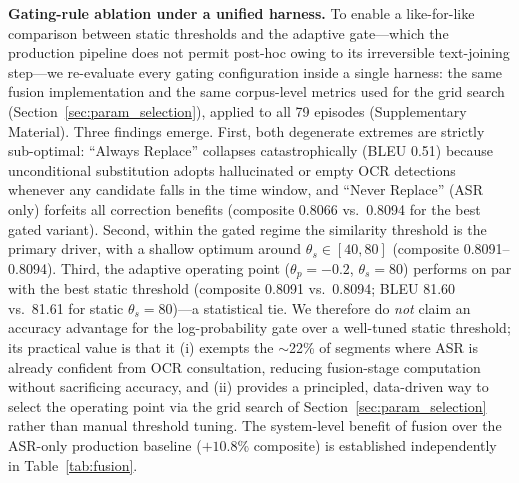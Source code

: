 \documentclass[journal]{IEEEtran}
\begin{document}
\begin{table}[t]
\centering
\caption{Adaptive multimodal fusion results. Composite score defined in Eq.~\ref{eq:composite}. Best results in bold.}
\label{tab:fusion}
\end{table}



\textbf{Gating-rule ablation under a unified harness.}
To enable a like-for-like comparison between static thresholds and the adaptive gate---which the production pipeline does not permit post-hoc owing to its irreversible text-joining step---we re-evaluate every gating configuration inside a single harness: the same fusion implementation and the same corpus-level metrics used for the grid search (Section~\ref{sec:param_selection}), applied to all 79 episodes (Supplementary Material).
Three findings emerge.
First, both degenerate extremes are strictly sub-optimal: ``Always Replace'' collapses catastrophically (BLEU 0.51) because unconditional substitution adopts hallucinated or empty OCR detections whenever any candidate falls in the time window, and ``Never Replace'' (ASR only) forfeits all correction benefits (composite 0.8066 vs.\ 0.8094 for the best gated variant).
Second, within the gated regime the similarity threshold is the primary driver, with a shallow optimum around $\theta_s \in [40, 80]$ (composite 0.8091--0.8094).
Third, the adaptive operating point ($\theta_p{=}-0.2$, $\theta_s{=}80$) performs on par with the best static threshold (composite 0.8091 vs.\ 0.8094; BLEU 81.60 vs.\ 81.61 for static $\theta_s{=}80$)---a statistical tie.
We therefore do \emph{not} claim an accuracy advantage for the log-probability gate over a well-tuned static threshold; its practical value is that it (i) exempts the $\sim$22\% of segments where ASR is already confident from OCR consultation, reducing fusion-stage computation without sacrificing accuracy, and (ii) provides a principled, data-driven way to select the operating point via the grid search of Section~\ref{sec:param_selection} rather than manual threshold tuning.
The system-level benefit of fusion over the ASR-only production baseline ($+10.8\%$ composite) is established independently in Table~\ref{tab:fusion}.
\end{document}
